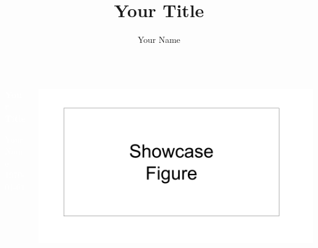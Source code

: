 \documentclass[aspectratio=169]{beamer}
\title{Your Title}
\author{Your Name}
\institute[LMU]{LMU} %
{

}
\begin{document}
{
\begin{frame}
\begin{columns}
	\begin{column}{0.4\textwidth}
		\vspace{3cm}
		
		\textbf{\textcolor{white}{\Large Your Title}}
		\vspace{1cm}
		
		\textcolor{white}{\footnotesize Your Name \\
			\today}
	\end{column}
	\begin{column}{0.49\textwidth}
		\vspace{2cm}
		\begin{center}
			\includegraphics[width=1\textwidth]{../figures/showcase_figure.png}
		\end{center}
	\end{column}
\end{columns}
\end{frame}
}
\end{document}
